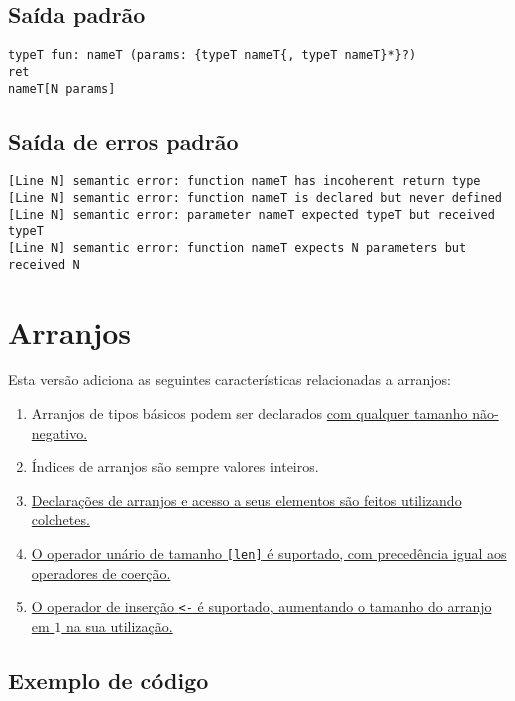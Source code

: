 \documentclass{sftex/sftex}
\newenvironment{smallenum}{
    \vspace{-1mm}
    \begin{enumerate}[label=\roman*.]
    \setlength{\parskip}{0pt}
    \setlength{\itemsep}{2pt}
}{
    \vspace{-2mm}
    \end{enumerate}
}
\begin{document}
\subsection{Saída padrão}

\begin{verbatim}
typeT fun: nameT (params: {typeT nameT{, typeT nameT}*}?)
ret
nameT[N params]
\end{verbatim}

\subsection{Saída de erros padrão}

\begin{verbatim}
[Line N] semantic error: function nameT has incoherent return type
[Line N] semantic error: function nameT is declared but never defined
[Line N] semantic error: parameter nameT expected typeT but received typeT
[Line N] semantic error: function nameT expects N parameters but received N
\end{verbatim}

\section{Arranjos}

Esta versão adiciona as seguintes características relacionadas a arranjos:

\begin{smallenum}

\item Arranjos de tipos básicos podem ser declarados \uline{com qualquer
    tamanho não-negativo.}

\item Índices de arranjos são sempre valores inteiros.

\item \uline{Declarações de arranjos e acesso a seus elementos são feitos
    utilizando colchetes.}

\item \uline{O operador unário de tamanho \verb![len]! é suportado, com
    precedência igual aos operadores de coerção.}

\item \uline{O operador de inserção \verb!<-! é suportado, aumentando
    o tamanho do arranjo em $1$ na sua utilização.}

\end{smallenum}

\subsection{Exemplo de código}
\end{document}
